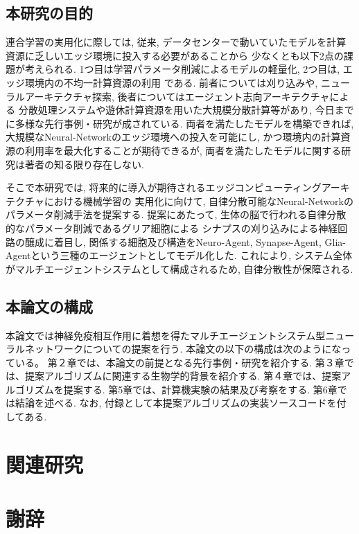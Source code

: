 \section{本研究の目的}
連合学習の実用化に際しては, 
従来, データセンターで動いていたモデルを計算資源に乏しいエッジ環境に投入する必要があることから
少なくとも以下2点の課題が考えられる.
1つ目は学習パラメータ削減によるモデルの軽量化, 
2つ目は, エッジ環境内の不均一計算資源の利用
である.
前者については刈り込みや, ニューラルアーキテクチャ探索, 後者についてはエージェント志向アーキテクチャによる
分散処理システムや遊休計算資源を用いた大規模分散計算等があり, 
今日までに多様な先行事例・研究が成されている. 
両者を満たしたモデルを構築できれば, 
大規模なNeural-Networkのエッジ環境への投入を可能にし, 
かつ環境内の計算資源の利用率を最大化することが期待できるが,  
両者を満たしたモデルに関する研究は著者の知る限り存在しない.

そこで本研究では, 将来的に導入が期待されるエッジコンピューティングアーキテクチャにおける機械学習の
実用化に向けて, 自律分散可能なNeural-Networkのパラメータ削減手法を提案する.
提案にあたって, 生体の脳で行われる自律分散的なパラメータ削減であるグリア細胞による
シナプスの刈り込みによる神経回路の醸成に着目し, 関係する細胞及び構造をNeuro-Agent, Synapse-Agent, 
Glia-Agentという三種のエージェントとしてモデル化した. 
これにより, システム全体がマルチエージェントシステムとして構成されるため, 自律分散性が保障される.
\section{本論文の構成}
本論文では神経免疫相互作用に着想を得たマルチエージェントシステム型ニューラルネットワークについての提案を行う.
 本論文の以下の構成は次のようになっている。
 第２章では、本論文の前提となる先行事例・研究を紹介する.
 第３章では、提案アルゴリズムに関連する生物学的背景を紹介する.
 第４章では、提案アルゴリズムを提案する.
 第5章では、計算機実験の結果及び考察をする.
 第6章では結論を述べる.
 なお, 付録として本提案アルゴリズムの実装ソースコードを付してある.
\chapter{関連研究}
\chapter{謝辞}

